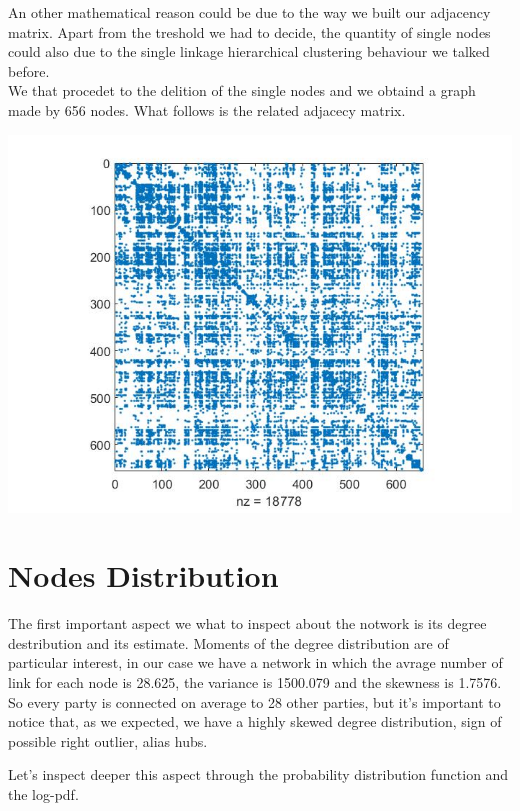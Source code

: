 \documentclass{article}%
\begin{document}
An other mathematical reason could be due to the way we built our adjacency matrix. Apart from the treshold we had to decide, the quantity of single nodes could also due to the single linkage hierarchical clustering behaviour we talked before. 
\\

We that procedet to the delition of the single nodes and we obtaind a graph made by 656 nodes.
What follows is the related adjacecy matrix.

\includegraphics[scale=0.5]{Adj}

\section*{Nodes Distribution}

The first important aspect we what to inspect about the notwork is its degree destribution and its estimate. Moments of the degree distribution are of particular interest, in our case we have a network in which the avrage number of link for each node is 28.625, the variance is 1500.079 and the skewness is 1.7576.
So every party is connected on average to 28 other parties, but it's important to notice that, as we expected, we have a highly skewed degree distribution, sign of possible right outlier, alias hubs.


Let's inspect deeper this aspect through the probability distribution function and the log-pdf.
\end{document}
